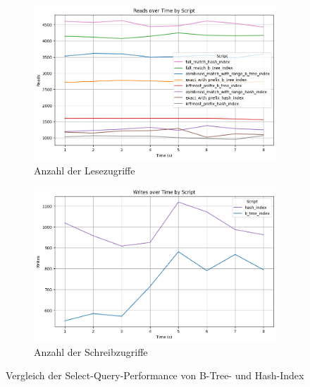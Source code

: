 \vspace{-4pt}
\begin{figure}[H]
    \centering
    \begin{subfigure}[t]{0.48\textwidth}
        \centering
        \includegraphics[width=\textwidth]{PNGs/Script/Index/B_Tree/hash-vs-b-tree-comparison/Reads}
        \caption{Anzahl der Lesezugriffe}
        \label{indexing-hash-vs-b-tree-comparison-reads}
    \end{subfigure}
    \hfill
    \begin{subfigure}[t]{0.48\textwidth}
        \centering
        \includegraphics[width=\textwidth]{PNGs/Script/Index/B_Tree/hash-vs-b-tree-comparison/Writes}
        \caption{Anzahl der Schreibzugriffe}
        \label{indexing-hash-vs-b-tree-comparison-writes}
    \end{subfigure}
    \vspace{-2pt}
    \caption[Indexing: Vergleich von B-Tree- und Hash-Index]{Vergleich der Select-Query-Performance von B-Tree- und Hash-Index}
    \label{fig:indexing-hash-b-tree-comp}
\end{figure}
\vspace{-12pt}

